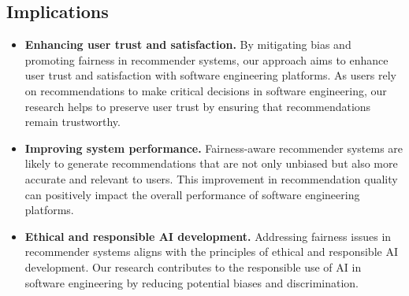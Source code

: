 \subsection{Implications}







\begin{itemize}
	\item \textbf{Enhancing user trust and satisfaction.} By mitigating bias and promoting fairness in recommender systems, our approach aims to enhance user trust and satisfaction with software engineering platforms. %
	As users rely on recommendations to make critical decisions in software engineering, our research helps to preserve user trust by ensuring that recommendations remain trustworthy.

	\item \textbf{Improving system performance.} Fairness-aware recommender systems are likely to generate recommendations that are not only unbiased but also more accurate and relevant to users. This improvement in recommendation quality can positively impact the overall performance of software engineering platforms. %

	\item \textbf{Ethical and responsible AI development.} Addressing fairness issues in recommender systems aligns with the principles of ethical and responsible AI development. Our research contributes to the responsible use of AI in software engineering by reducing potential biases and discrimination. %
 

\end{itemize}
